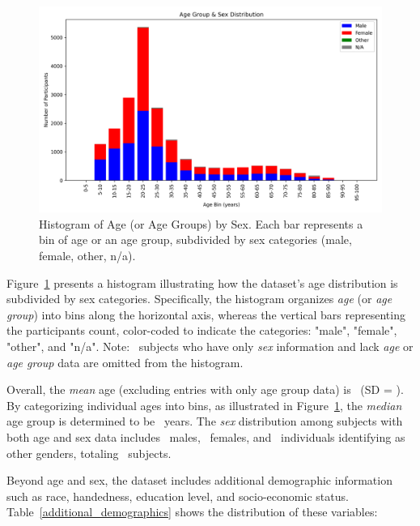 \begin{figure}[ht]
    \centering
    \includegraphics[width=\linewidth]{figures/age_group_sex_histogram} 
    \caption{Histogram of Age (or Age Groups) by Sex. Each bar represents a bin of age or an age group, subdivided by sex categories (male, female, other, n/a).}
    \label{HistogramAgeSexFigure}
\end{figure}


\noindent
Figure~\ref{HistogramAgeSexFigure} presents a histogram illustrating how the dataset's age distribution is subdivided by sex categories. 
Specifically, the histogram organizes \textit{age} (or \textit{age group}) into bins along the horizontal axis, whereas the vertical bars 
representing the participants count, color-coded to indicate the categories: "male", "female", "other", and "n/a". Note: \TotalSubjectsWithSexCountWithoutAgeInfo\ 
subjects who have only \textit{sex} information and lack \textit{age} or \textit{age group} data are omitted from the histogram.


Overall, the \textit{mean} age (excluding entries with only age group data) is \TotalSubjectsMeanAgeValue\ (SD = \TotalSubjectsStandardDevValue{}). 
By categorizing individual ages into bins, as illustrated in Figure~\ref{HistogramAgeSexFigure}, the \textit{median} age group is determined to be \TotalSubjectsMedianAgeGroupValue\ years.
The \textit{sex} distribution among subjects with both age and sex data includes \TotalSubjectsWithMaleSexCount\ males, \TotalSubjectsWithFemaleCount\ females, 
and \TotalSubjectsWithOtherSexCount\ individuals identifying as other genders, totaling \TotalSubjectsWithSexCount\ subjects. 

Beyond age and sex, the dataset includes additional demographic information such as race, handedness, education level, and socio-economic status. 
Table~\ref{additional_demographics} shows the distribution of these variables:


